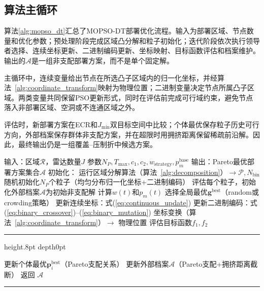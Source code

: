\subsection{算法主循环}

算法\ref{alg:mopso_dt}汇总了MOPSO-DT部署优化流程。输入为部署区域、节点数量和优化参数；预处理阶段完成区域凸分解和粒子初始化；迭代阶段依次执行领导者选择、连续坐标更新、二进制编码更新、坐标映射、目标函数评估和档案维护。输出的$\mathcal{A}$是一组非支配部署方案，而不是单个固定解。

主循环中，连续变量给出节点在所选凸子区域内的归一化坐标，并经算法~\ref{alg:coordinate_transform}映射为物理位置；二进制变量决定节点所属凸子区域。两类变量共同保留PSO更新形式，同时在评估前完成可行域约束，避免节点落入非部署区域、空洞或不连通区域之外。

评估时，新部署方案在ECR和$J_{\min}$双目标空间中比较；个体最优保存粒子历史可行方向，外部档案保存群体非支配方案，并在超限时用拥挤距离保留稀疏前沿解。因此，最终输出仍是一组覆盖--压制折中候选方案。

\Needspace{0.48\textheight}
\begin{algorithm}
\caption{MOPSO-DT多目标部署优化}
\label{alg:mopso_dt}
\begin{algorithmic}[1]
\STATE 输入：区域$\mathcal{R}$，雷达数量$J$
\STATE \quad 参数$N_P, T_{\max}, c_1, c_2, w_{\text{strategy}}, p_m^{\text{base}}$
\STATE 输出：Pareto最优部署方案集合$\mathcal{A}$
\STATE 初始化：
\STATE \quad 运行区域分解算法（算法~\ref{alg:decomposition}）$\to \mathcal{P}, N_{\text{bin}}$
\STATE \quad 随机初始化$N_P$个粒子（均匀分布归一化坐标+二进制编码）
\STATE \quad 评估每个粒子，初始化外部档案$\mathcal{A}$为初始非支配解
    \STATE 计算$w(t)$和$p_m(t)$
        \STATE 选择全局最优$\mathbf{g}^{\text{best}}$（random或crowding策略）
        \STATE 更新连续坐标：式(\ref{eq:continuous_update})
        \STATE 更新二进制编码：式(\ref{eq:binary_crossover})--(\ref{eq:binary_mutation})
        \STATE 坐标变换（算法~\ref{alg:coordinate_transform}）$\to$ 物理位置
        \STATE 评估目标函数$f_1, f_2$
\end{algorithmic}
\end{algorithm}

\vskip 20pt
\noindent{}\par
\hrule height.8pt depth0pt \kern2pt
\begin{algorithmic}[1]
        \STATE 更新个体最优$\mathbf{p}_i^{\text{best}}$（Pareto支配关系）
    \ENDFOR
    \STATE 更新外部档案$\mathcal{A}$（Pareto支配+拥挤距离截断）
\ENDFOR
\STATE 返回 $\mathcal{A}$
\end{algorithmic}
\kern2pt\hrule\relax
\vskip 20pt

